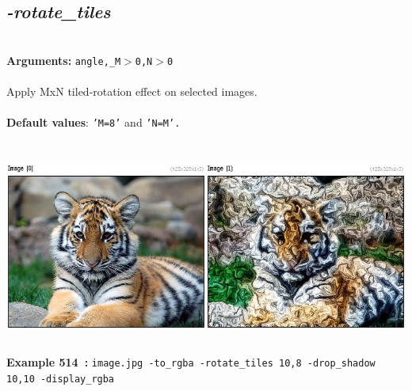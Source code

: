 \documentclass[a4paper,11pt,twoside]{book}
\begin{document}
\subsection{\emph{-rotate\_tiles} }\vspace*{-0.5em}
~\\\textbf{Arguments: } 
{\small \texttt{angle,\_M$>$0,N$>$0}}\\~\\
Apply MxN tiled-rotation effect on selected images.
~\\~\\\textbf{Default values}: {\small \texttt{'M=8'} and \texttt{'N=M'.}}
\begin{center}\includegraphics[keepaspectratio=true,height=7cm,width=\textwidth]{img/gmic_def514.jpg}\\
{\footnotesize \textbf{Example 514~:} \texttt{image.jpg -to\_rgba -rotate\_tiles 10,8 -drop\_shadow 10,10 -display\_rgba}}
\end{center}
\end{document}
